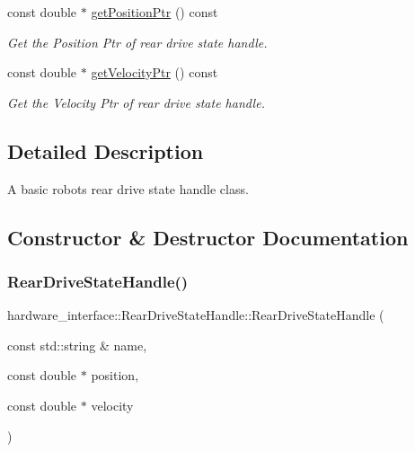 \begin{DoxyCompactItemize}
const double $\ast$ \hyperlink{classhardware__interface_1_1RearDriveStateHandle_ab2441941201b3468861c582b06a4df96}{get\+Position\+Ptr} () const
\begin{DoxyCompactList}\small\item\em Get the Position Ptr of rear drive state handle. \end{DoxyCompactList}\item 
const double $\ast$ \hyperlink{classhardware__interface_1_1RearDriveStateHandle_aaac1ccae17568c0107f88a7165a236ba}{get\+Velocity\+Ptr} () const
\begin{DoxyCompactList}\small\item\em Get the Velocity Ptr of rear drive state handle. \end{DoxyCompactList}\end{DoxyCompactItemize}


\subsection{Detailed Description}
A basic robot\textquotesingle{}s rear drive state handle class. 

\subsection{Constructor \& Destructor Documentation}
\mbox{\label{classhardware__interface_1_1RearDriveStateHandle_abf8b4ca793044ef32d878647b792e8d3}} 
\subsubsection{\texorpdfstring{Rear\+Drive\+State\+Handle()}{RearDriveStateHandle()}}
{\footnotesize\ttfamily hardware\+\_\+interface\+::\+Rear\+Drive\+State\+Handle\+::\+Rear\+Drive\+State\+Handle (\begin{DoxyParamCaption}\item[{const std\+::string \&}]{name,  }\item[{const double $\ast$}]{position,  }\item[{const double $\ast$}]{velocity }\end{DoxyParamCaption})\hspace{0.3cm}{\ttfamily [inline]}}



